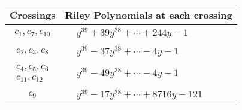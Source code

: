 \documentclass[1p]{elsarticle_modified}
\theoremstyle{definition}
\begin{document}
\begin{tabular}{m{50pt}|m{274pt}}
Crossings & \hspace{64pt}Riley Polynomials at each crossing \\
\hline $$\begin{aligned}c_{1},c_{7},c_{10}\end{aligned}$$&$\begin{aligned}
&y^{39}+39 y^{38}+\cdots+244 y-1
\end{aligned}$\\
\hline $$\begin{aligned}c_{2},c_{3},c_{8}\end{aligned}$$&$\begin{aligned}
&y^{39}-37 y^{38}+\cdots-4 y-1
\end{aligned}$\\
\hline $$\begin{aligned}c_{4},c_{5},c_{6}\\c_{11},c_{12}\end{aligned}$$&$\begin{aligned}
&y^{39}-49 y^{38}+\cdots-4 y-1
\end{aligned}$\\
\hline $$\begin{aligned}c_{9}\end{aligned}$$&$\begin{aligned}
&y^{39}-17 y^{38}+\cdots+8716 y-121
\end{aligned}$\\
\hline
\end{tabular}
\vskip 2pc
\end{document}
